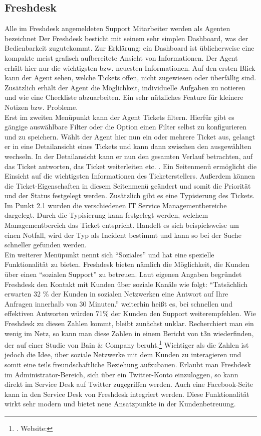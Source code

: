 \subsection{Freshdesk}
\noindent
Alle im Freshdesk angemeldeten Support Mitarbeiter werden als Agenten bezeichnet
Der Freshdesk besticht mit seinem sehr simplen Dashboard, was der Bedienbarkeit zugutekommt. Zur Erklärung: ein Dashboard ist üblicherweise eine kompakte meist grafisch aufbereitete Ansicht von Informationen. Der Agent erhält hier nur die wichtigsten bzw. neuesten Informationen. Auf den ersten Blick kann der Agent sehen, welche Tickets offen, nicht zugewiesen oder überfällig sind. Zusätzlich erhält der Agent die Möglichkeit, individuelle Aufgaben zu notieren und wie eine Checkliste abzuarbeiten. Ein sehr nützliches Feature für kleinere Notizen bzw. Probleme.\\ 
Erst im zweiten Menüpunkt kann der Agent Tickets filtern. Hierfür gibt es gängige auswählbare Filter oder die Option einen Filter selbst zu konfigurieren und zu speichern. Wählt der Agent hier nun ein oder mehrere Ticket aus, gelangt er in eine Detailansicht eines Tickets und kann dann zwischen den ausgewählten wechseln. In der Detailansicht kann er nun den gesamten Verlauf betrachten, auf das Ticket antworten, das Ticket weiterleiten etc. . Ein Seitenmenü ermöglicht die Einsicht auf die wichtigsten Informationen des Ticketerstellers. Außerdem können die Ticket-Eigenschaften in diesem Seitenmenü geändert und somit die Priorität und der Status festgelegt werden. Zusätzlich gibt es eine Typisierung des Tickets. Im Punkt 2.1 wurden die verschiedenen IT Service Managementbereiche dargelegt. Durch die Typisierung kann festgelegt werden, welchem Managementbereich das Ticket entspricht. Handelt es sich beispielsweise um einen Notfall, wird der Typ als Incident bestimmt und kann so bei der Suche schneller gefunden werden.\\
Ein weiterer Menüpunkt nennt sich \enquote{Soziales} und hat eine spezielle Funktionalität zu bieten. Freshdesk bieten nämlich die Möglichkeit, die Kunden über einen \enquote{sozialen Support} zu betreuen. Laut eigenen Angaben begründet Freshdesk den Kontakt mit Kunden über soziale Kanäle wie folgt: \enquote{Tatsächlich erwarten 32 \% der Kunden in sozialen Netzwerken eine Antwort auf Ihre Anfragen innerhalb von 30 Minuten.} weiterhin heißt es, bei schnellen und effektiven Antworten würden 71\% der Kunden den Support weiterempfehlen. Wie Freshdesk zu diesen Zahlen kommt, bleibt zunächst unklar. Recherchiert man ein wenig im Netz, so kann man diese Zahlen in einem Bericht von t3n wiederfinden, der auf einer Studie von  Bain \& Company beruht.\footnote{\citeauthor{Rixecker}. Website:\cite{Rixecker}} Wichtiger als die Zahlen ist jedoch die Idee, über soziale Netzwerke mit dem Kunden zu interagieren und somit eine teils freundschaftliche Beziehung aufzubauen. Erlaubt man Freshdesk im Administrator-Bereich, sich über ein Twitter-Konto einzuloggen, so kann direkt im Service Desk auf Twitter zugegriffen werden. Auch eine Facebook-Seite kann in den Service Desk von Freshdesk integriert werden. Diese Funktionalität wirkt sehr modern und bietet neue Ansatzpunkte in der Kundenbetreuung.\\

